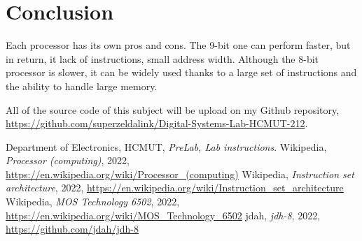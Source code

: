 \documentclass[13pt,a4paper]{report}
\begin{document}
\chapter{Conclusion}
Each processor has its own pros and cons. The 9-bit one can perform faster, but in return, it lack of instructions, small address width. Although the 8-bit processor is slower, it can be widely used thanks to a large set of instructions and the ability to handle large memory.

All of the source code of this subject will be upload on my Github repository, \url{https://github.com/superzeldalink/Digital-Systems-Lab-HCMUT-212}.

\begingroup
\let\clearpage\relax
\titlespacing{\chapter}{0pt}{30pt}{10pt}
\begin{thebibliography}{6}
	 Department of Electronics, HCMUT, \textit{PreLab, Lab instructions}.
	 Wikipedia, \textit{Processor (computing)}, 2022, \url{https://en.wikipedia.org/wiki/Processor_(computing)}
	 Wikipedia, \textit{Instruction set architecture}, 2022, \url{
	https://en.wikipedia.org/wiki/Instruction_set_architecture}
	 Wikipedia, \textit{MOS Technology 6502}, 2022, \url{https://en.wikipedia.org/wiki/MOS_Technology_6502}
	 jdah, \textit{jdh-8}, 2022, \url{https://github.com/jdah/jdh-8}
\end{thebibliography}

\endgroup
\end{document}
